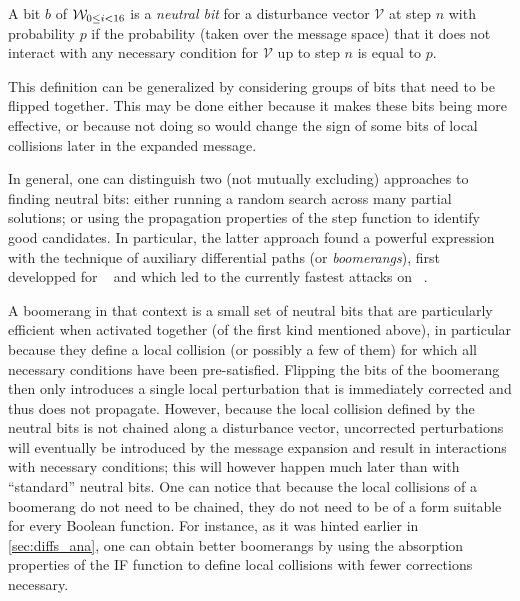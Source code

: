\begin{defi}
A bit $b$ of $\mathcal{W}_{0 \leq i < 16}$ is a \emph{neutral bit} for a disturbance vector $\mathcal{V}$ at step $n$ with probability $p$ if the probability (taken over the message space) that it does not interact
with any necessary condition for $\mathcal{V}$ up to step $n$ is equal to $p$. 
\end{defi}

This definition can be generalized by considering groups of bits that need to be flipped together. This may be done either because it makes these bits being more effective, or because not doing so would
change the sign of some bits of local collisions later in the expanded message.

In general, one can distinguish two (not mutually excluding) approaches to finding neutral bits: either running a random search across many partial solutions; or using the propagation properties of the step function to identify
good candidates. In particular, the latter approach found a powerful expression with the technique of auxiliary differential paths (or \emph{boomerangs}), first developped for \shaone~\cite{DBLP:conf/crypto/JouxP07}
and which led to the currently fastest attacks on \shazero~\cite{DBLP:conf/fse/ManuelP08}.

A boomerang in that context is a small set of neutral bits that are particularly efficient when activated together (\ie of the first kind mentioned above), in particular because they define a local collision (or possibly
a few of them) for which all necessary conditions have been pre-satisfied. Flipping the bits of the boomerang then only introduces a single local perturbation that is immediately corrected and thus does not propagate.
However, because the local collision defined by the neutral bits is not chained along a disturbance vector, uncorrected perturbations will eventually be introduced by the message expansion and result in interactions
with necessary conditions; this will however happen much later than with ``standard'' neutral bits. One can notice that because the local collisions of a boomerang do not need to be chained, they do not need to
be of a form suitable for every Boolean function. For instance, as it was hinted earlier in \autoref{sec:diffs_ana}, one can obtain better boomerangs by using the absorption properties of the IF function to define
local collisions with fewer corrections necessary.


